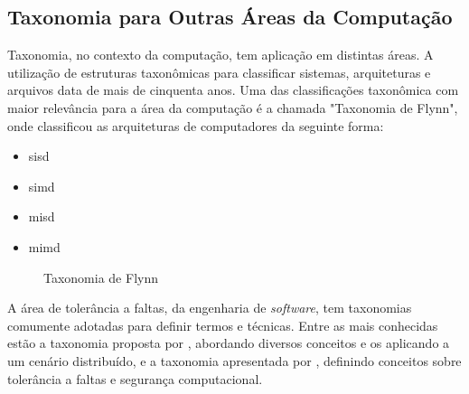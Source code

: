 \subsection{Taxonomia para Outras Áreas da Computação}
\label{subsec:taxonomia other computer areas}
Taxonomia, no contexto da computação, tem aplicação em distintas áreas. A utilização de estruturas taxonômicas para classificar sistemas, arquiteturas e arquivos data de mais de
cinquenta anos. Uma das classificações taxonômica com maior relevância para a área da computação é a chamada "Taxonomia de Flynn",
onde  classificou as arquiteturas de computadores da seguinte forma:\\

\begin{minipage}{.66\textwidth}
    \begin{singlespace}
        \begin{itemize}
            \item \acrfull{sisd}
            \item \acrfull{simd}
            \item \acrfull{misd}
            \item \acrfull{mimd}
        \end{itemize}
    \end{singlespace}
\end{minipage}
\vspace{0.5cm}

\begin{figure}[!ht]
    \caption{Taxonomia de Flynn}
    \label{fig:taxonomiaFlynn}  
\end{figure}

\vspace{0.5cm}
\par
A área de tolerância a faltas, da engenharia de \textit{software}, tem taxonomias comumente adotadas para definir termos e técnicas.
Entre as mais conhecidas estão a taxonomia proposta por , abordando diversos conceitos e os aplicando a um cenário distribuído,
e a taxonomia apresentada por , definindo conceitos sobre tolerância a faltas e segurança computacional.


